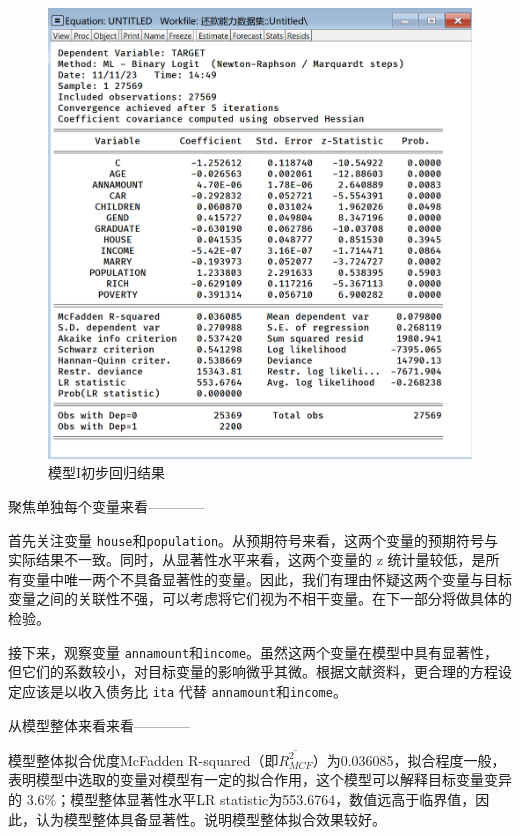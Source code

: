 \documentclass[13.5pt,hyperref,a4paper,UTF8]{ctexart}
\begin{document}
\begin{figure}[H]
    \centering
    \includegraphics[width=1\linewidth]{figures//3回归//回归1/第一次logit模型.png}
    \caption{模型I初步回归结果}
    \label{第一次logit模型}
\end{figure}

聚焦单独每个变量来看————

首先关注变量 \texttt{house}和\texttt{population}。从预期符号来看，这两个变量的预期符号与实际结果不一致。同时，从显著性水平来看，这两个变量的 z 统计量较低，是所有变量中唯一两个不具备显著性的变量。因此，我们有理由怀疑这两个变量与目标变量之间的关联性不强，可以考虑将它们视为不相干变量。在下一部分将做具体的检验。

接下来，观察变量 \texttt{annamount}和\texttt{income}。虽然这两个变量在模型中具有显著性，但它们的系数较小，对目标变量的影响微乎其微。根据文献资料，更合理的方程设定应该是以收入债务比 \texttt{ita} 代替 \texttt{annamount}和\texttt{income}。


从模型整体来看来看————

模型整体拟合优度McFadden R-squared（即$\overline{R^2_{MCF}}$）为0.036085，拟合程度一般，表明模型中选取的变量对模型有一定的拟合作用，这个模型可以解释目标变量变异的 3.6\%；模型整体显著性水平LR statistic为553.6764，数值远高于临界值，因此，认为模型整体具备显著性。说明模型整体拟合效果较好。
\end{document}
